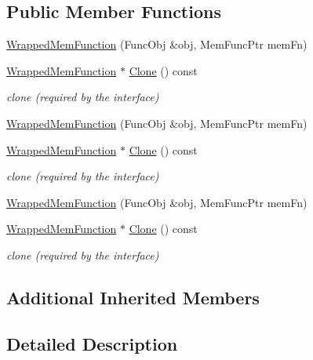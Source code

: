 \subsection*{Public Member Functions}
\begin{DoxyCompactItemize}
\item 
\mbox{\hyperlink{classROOT_1_1Math_1_1WrappedMemFunction_aae43e563f02bf4c9a2a833ff13c60234}{Wrapped\+Mem\+Function}} (Func\+Obj \&obj, Mem\+Func\+Ptr mem\+Fn)
\item 
\mbox{\hyperlink{classROOT_1_1Math_1_1WrappedMemFunction}{Wrapped\+Mem\+Function}} $\ast$ \mbox{\hyperlink{classROOT_1_1Math_1_1WrappedMemFunction_a6f27e92240e16003ff20c25df6fba1eb}{Clone}} () const
\begin{DoxyCompactList}\small\item\em clone (required by the interface) \end{DoxyCompactList}\item 
\mbox{\hyperlink{classROOT_1_1Math_1_1WrappedMemFunction_aae43e563f02bf4c9a2a833ff13c60234}{Wrapped\+Mem\+Function}} (Func\+Obj \&obj, Mem\+Func\+Ptr mem\+Fn)
\item 
\mbox{\hyperlink{classROOT_1_1Math_1_1WrappedMemFunction}{Wrapped\+Mem\+Function}} $\ast$ \mbox{\hyperlink{classROOT_1_1Math_1_1WrappedMemFunction_a6f27e92240e16003ff20c25df6fba1eb}{Clone}} () const
\begin{DoxyCompactList}\small\item\em clone (required by the interface) \end{DoxyCompactList}\item 
\mbox{\hyperlink{classROOT_1_1Math_1_1WrappedMemFunction_aae43e563f02bf4c9a2a833ff13c60234}{Wrapped\+Mem\+Function}} (Func\+Obj \&obj, Mem\+Func\+Ptr mem\+Fn)
\item 
\mbox{\hyperlink{classROOT_1_1Math_1_1WrappedMemFunction}{Wrapped\+Mem\+Function}} $\ast$ \mbox{\hyperlink{classROOT_1_1Math_1_1WrappedMemFunction_a6f27e92240e16003ff20c25df6fba1eb}{Clone}} () const
\begin{DoxyCompactList}\small\item\em clone (required by the interface) \end{DoxyCompactList}\end{DoxyCompactItemize}
\subsection*{Additional Inherited Members}


\subsection{Detailed Description}

